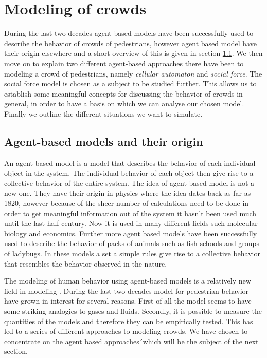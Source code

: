 \section{Modeling of crowds}
\label{sec:crowds}
During the last two decades agent based models have been successfully  used to 
describe the behavior of crowds of pedestrians, however agent based model have their 
origin elsewhere and a short overview of this is given in section \ref{subsec:ABM}. We 
then move on to explain two different agent-based approaches there have been to modeling 
a crowd of pedestrians, namely \emph{cellular automaton} and \emph{social force}. 
The social force model is chosen as a subject to be studied further. This allows us 
to establish some meaningful concepts for discussing the behavior of crowds in general, 
in order to have a basis on which we can analyse our chosen model. Finally we outline 
the different situations we want to simulate.

\subsection{Agent-based models and their origin}\label{subsec:ABM}
An agent based model is a model that describes the behavior of each individual 
object in the system. The individual behavior of each object then give rise to 
a collective behavior of the entire system. The idea of agent based model is not 
a new one. They have their origin in physics where the idea dates back as far as 1820, 
 however because of the sheer number of calculations need to be done in order to get 
meaningful information out of the system it hasn't been used much until the last half 
century\cite{simintro}. Now it is used in many different fields such molecular biology 
and economics\cite{MDbio}. Further more agent based models have been successfully used 
to describe the behavior of packs of animals such as fish schools and groups of ladybugs. 
In these models a set a simple rules give rise to a collective behavior that resembles the 
behavior observed in the nature. 

The modeling of human behavior using agent-based models is a relatively new field in 
modeling \cite{helbing00}. During the last two decades model for pedestrian behavior 
have grown in interest for several reasons. First of all the model seems to have some 
striking analogies to gases and fluids. Secondly, it is possible to measure the quantities 
of the models and therefore they can be empirically tested. This has led to a series of 
different approaches to modeling crowds. We have chosen to concentrate on the agent based 
approaches´which will be the subject of the next section.

